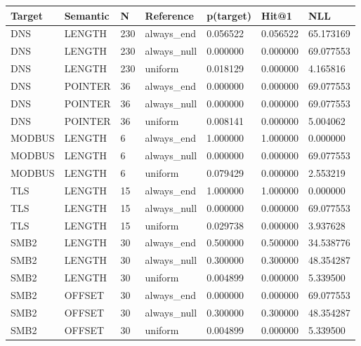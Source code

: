 \begin{tabular}{lllllll}
\hline
Target & Semantic & N & Reference & p(target) & Hit@1 & NLL \\
\hline
DNS & LENGTH & 230 & always\_end & 0.056522 & 0.056522 & 65.173169 \\
DNS & LENGTH & 230 & always\_null & 0.000000 & 0.000000 & 69.077553 \\
DNS & LENGTH & 230 & uniform & 0.018129 & 0.000000 & 4.165816 \\
DNS & POINTER & 36 & always\_end & 0.000000 & 0.000000 & 69.077553 \\
DNS & POINTER & 36 & always\_null & 0.000000 & 0.000000 & 69.077553 \\
DNS & POINTER & 36 & uniform & 0.008141 & 0.000000 & 5.004062 \\
MODBUS & LENGTH & 6 & always\_end & 1.000000 & 1.000000 & 0.000000 \\
MODBUS & LENGTH & 6 & always\_null & 0.000000 & 0.000000 & 69.077553 \\
MODBUS & LENGTH & 6 & uniform & 0.079429 & 0.000000 & 2.553219 \\
TLS & LENGTH & 15 & always\_end & 1.000000 & 1.000000 & 0.000000 \\
TLS & LENGTH & 15 & always\_null & 0.000000 & 0.000000 & 69.077553 \\
TLS & LENGTH & 15 & uniform & 0.029738 & 0.000000 & 3.937628 \\
SMB2 & LENGTH & 30 & always\_end & 0.500000 & 0.500000 & 34.538776 \\
SMB2 & LENGTH & 30 & always\_null & 0.300000 & 0.300000 & 48.354287 \\
SMB2 & LENGTH & 30 & uniform & 0.004899 & 0.000000 & 5.339500 \\
SMB2 & OFFSET & 30 & always\_end & 0.000000 & 0.000000 & 69.077553 \\
SMB2 & OFFSET & 30 & always\_null & 0.300000 & 0.300000 & 48.354287 \\
SMB2 & OFFSET & 30 & uniform & 0.004899 & 0.000000 & 5.339500 \\
\hline
\end{tabular}
